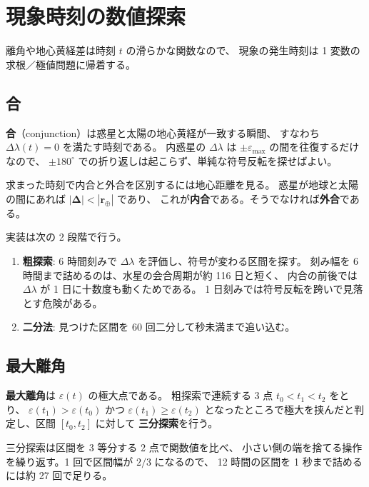\documentclass[a4paper,11pt]{ltjsarticle}
\newcommand{\vek}[1]{\boldsymbol{#1}}
\begin{document}
\section{現象時刻の数値探索}
\label{sec:events}

離角や地心黄経差は時刻 $t$ の滑らかな関数なので、
現象の発生時刻は 1 変数の求根／極値問題に帰着する。

\subsection{合}

\textbf{合}（conjunction）は惑星と太陽の地心黄経が一致する瞬間、
すなわち $\Delta\lambda(t) = 0$ を満たす時刻である。
内惑星の $\Delta\lambda$ は $\pm\varepsilon_{\max}$ の間を往復するだけなので、
$\pm180^\circ$ での折り返しは起こらず、単純な符号反転を探せばよい。

求まった時刻で内合と外合を区別するには地心距離を見る。
惑星が地球と太陽の間にあれば $|\vek{\Delta}| < |\vek{r}_\oplus|$ であり、
これが\textbf{内合}である。そうでなければ\textbf{外合}である。

実装は次の 2 段階で行う。

\begin{enumerate}
  \item \textbf{粗探索}: 6 時間刻みで $\Delta\lambda$ を評価し、符号が変わる区間を探す。
        刻み幅を 6 時間まで詰めるのは、水星の会合周期が約 116 日と短く、
        内合の前後では $\Delta\lambda$ が 1 日に十数度も動くためである。
        1 日刻みでは符号反転を跨いで見落とす危険がある。
  \item \textbf{二分法}: 見つけた区間を 60 回二分して秒未満まで追い込む。
\end{enumerate}

\subsection{最大離角}

\textbf{最大離角}は $\varepsilon(t)$ の極大点である。
粗探索で連続する 3 点 $t_0 < t_1 < t_2$ をとり、
$\varepsilon(t_1) > \varepsilon(t_0)$ かつ $\varepsilon(t_1) \ge \varepsilon(t_2)$
となったところで極大を挟んだと判定し、区間 $[t_0, t_2]$ に対して
\textbf{三分探索}を行う。

三分探索は区間を 3 等分する 2 点で関数値を比べ、
小さい側の端を捨てる操作を繰り返す。1 回で区間幅が $2/3$ になるので、
12 時間の区間を 1 秒まで詰めるには約 27 回で足りる。
\end{document}
